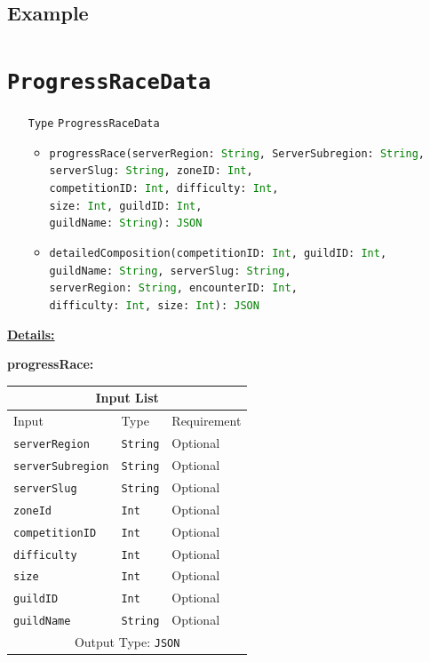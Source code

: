 \documentclass[10pt, a4paper]{memoir}
\numberwithin{equation}{section}
\theoremstyle{plain}
\theoremstyle{defp}
\theoremstyle{dotless}
\theoremstyle{definition}
\theoremstyle{dotless}
\theoremstyle{dotless}
\theoremstyle{defp}
\theoremstyle{defp}
\theoremstyle{be}          %
\theoremstyle{defp}
\newcommand\ttt[1]{\texttt{#1}}
\newcommand\type[1]{\ttt{\textcolor{green}{#1}}}
\begin{document}
\subsection{Example}

\newpage




\section{\ttt{ProgressRaceData}}\label{sec:ProgressRaceData}

\begin{itemize}[noitemsep,topsep=1pt]
	\item[\ttt{Type}] \ttt{ProgressRaceData}
	\begin{itemize}[itemsep=1pt,topsep=1pt]
		\item \ttt{progressRace(serverRegion: \type{String}, ServerSubregion: \type{String}, \\serverSlug: \type{String}, zoneID: \type{Int}, \\competitionID: \type{Int}, difficulty: \type{Int}, \\size: \type{Int}, guildID: \type{Int}, \\guildName: \type{String}): \type{JSON}}
		\item \ttt{detailedComposition(competitionID: \type{Int}, guildID: \type{Int}, \\guildName: \type{String}, serverSlug: \type{String}, \\serverRegion: \type{String}, encounterID: \type{Int}, \\difficulty: \type{Int}, size: \type{Int}): \type{JSON}}
	\end{itemize}
\end{itemize}

\underline{\textbf{Details:}}

\textbf{progressRace:}

\begin{table}[h!]
	\centering
	\begin{tabular}{ |p{4.2cm}|p{6cm}|p{3cm}|  }
		\hline
		\multicolumn{3}{|c|}{Input List} \\
		\hline
		Input & Type & Requirement\\
		\hline
		\ttt{serverRegion} & \ttt{String} & Optional\\
		\ttt{serverSubregion} & \ttt{String} & Optional\\
		\ttt{serverSlug} & \ttt{String} & Optional\\
		\ttt{zoneId} & \ttt{Int} & Optional\\
		\ttt{competitionID} & \ttt{Int} & Optional\\
		\ttt{difficulty} & \ttt{Int} & Optional\\
		\ttt{size} & \ttt{Int} & Optional\\
		\ttt{guildID} & \ttt{Int} & Optional\\
		\ttt{guildName} & \ttt{String} & Optional\\
		\hline
		\multicolumn{3}{|c|}{Output Type: \ttt{JSON}} \\
		\hline
	\end{tabular}
\end{table}
\end{document}
